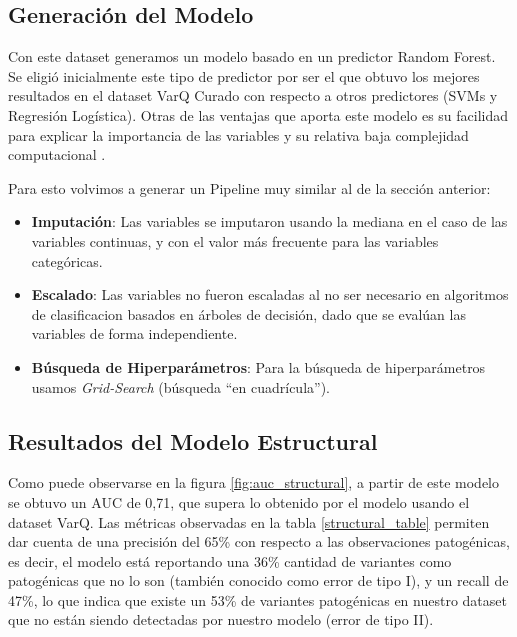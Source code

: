 

\subsection{Generación del Modelo}

Con este dataset generamos un modelo basado en un predictor Random Forest. 
Se eligió inicialmente este tipo de predictor por ser el que obtuvo los mejores resultados en el dataset VarQ Curado con respecto a otros predictores (SVMs y Regresión Logística). Otras de las ventajas que aporta este modelo es su facilidad para explicar la importancia de las variables y su relativa baja complejidad computacional \todo{[Citar?]}. 

Para esto volvimos a generar un Pipeline muy similar al de la sección anterior:

\begin{itemize}
 
\item \textbf{Imputación}: Las variables se imputaron usando la mediana en el caso de las variables continuas, y con el valor más frecuente para las variables categóricas. 
\item \textbf{Escalado}: Las variables no fueron escaladas al no ser necesario en algoritmos de clasificacion basados en árboles de decisión, dado que se evalúan las variables de forma independiente. 
\item \textbf{Búsqueda de Hiperparámetros}: Para la búsqueda de hiperparámetros usamos \textit{Grid-Search} (búsqueda ``en cuadrícula'').
\end{itemize}


\subsection{Resultados del Modelo Estructural}

Como puede observarse en la figura \ref{fig:auc_structural}, a partir de este modelo se obtuvo un AUC de 0,71, que supera lo obtenido por el modelo usando el dataset VarQ. Las métricas observadas en la tabla \ref{structural_table} permiten dar cuenta de una precisión del 65\% con respecto a las observaciones patogénicas, es decir, el modelo está reportando una 36\% cantidad de variantes como patogénicas que no lo son (también conocido como error de tipo I), y un recall de 47\%, lo que indica que existe un 53\% de variantes patogénicas en nuestro dataset que no están siendo detectadas por nuestro modelo (error de tipo II). 

